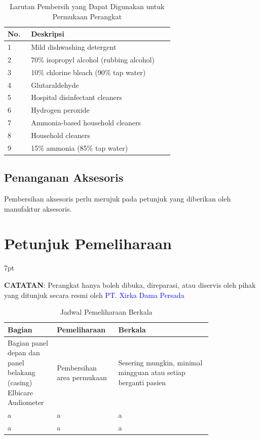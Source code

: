 \documentclass[11pt,a4paper,twoside,onecolumn]{book}
\newenvironment{formalblue}{%
	\def\FrameCommand{%
		\hspace{1pt}%
		{\color{blue}\vrule width 2pt}%
		{\color{formalshade}\vrule width 4pt}%
		\colorbox{formalshade}%
	}%
	\MakeFramed{\advance\hsize-\width\FrameRestore}%
	\noindent\hspace{-4.55pt}%
	\begin{adjustwidth}{}{7pt}%
		\vspace{2pt}\vspace{2pt}%
	}
	{%
		\vspace{2pt}\end{adjustwidth}\endMakeFramed%
}
\begin{document}
		\begin{table}
			\centering
			\caption{Larutan Pembersih yang Dapat Digunakan untuk Permukaan Perangkat}
			\label{tab:7.1}
			\begin{tabular}{|p{0.05\linewidth}  | p{0.6\linewidth}|}
				\hline
				No. & Deskripsi \\
				\hline
				\hline
				1 & Mild dishwashing detergent\\
				\hline
				2 & 70\% isopropyl alcohol (rubbing alcohol)\\
				\hline
				3 & 10\% chlorine bleach (90\% tap water)\\
				\hline
				4 & Glutaraldehyde\\
				\hline
				5 & Hospital disinfectant cleaners\\
				\hline
				6 & Hydrogen peroxide\\
				\hline
				7 & Ammonia-based household cleaners\\
				\hline
				8 & Household cleaners\\
				\hline
				9 & 15\% ammonia (85\% tap water)\\
				\hline
			\end{tabular}
		\end{table}
		
		\section{Penanganan Aksesoris}
		Pembersihan aksesoris perlu merujuk pada petunjuk yang diberikan oleh manufaktur aksesoris.
	\newpage
	
	\chapter{Petunjuk Pemeliharaan}
	\begin{formalblue}
		 \textbf{CATATAN}:
		Perangkat hanya boleh dibuka, direparasi, atau diservis oleh pihak yang ditunjuk secara resmi oleh \textcolor{blue}{PT. Xirka Dama Persada} 
	\end{formalblue}

	\begin{table}
		\centering
		\caption{Jadwal Pemeliharaan Berkala}
		\label{tab:7.2}
		\begin{tabular}{|p{0.2\linewidth}  | p{0.2\linewidth}| p{0.4\linewidth}|}
			\hline
			Bagian & Pemeliharaan & Berkala\\
			\hline
			\hline
			Bagian panel depan dan panel belakang (casing) Elbicare Audiometer & Pembersihan area permukaan & Sesering mungkin, minimal mingguan atau setiap berganti pasien\\
			\hline
			a & a & a\\
			\hline
			a & a & a\\
			\hline

		\end{tabular}
	\end{table}
\end{document}
